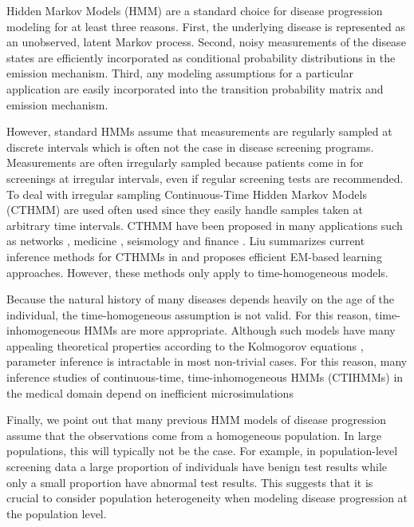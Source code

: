 \documentclass{article}
\begin{document}
Hidden Markov Models (HMM) are a standard choice for disease progression modeling for at least three reasons. 
First,  the underlying disease is represented as an unobserved, latent Markov process.  
Second,  noisy measurements of the disease states are efficiently incorporated as conditional probability distributions  in the emission mechanism. 
Third, any modeling assumptions for a particular application are easily incorporated into the transition probability matrix and emission mechanism. 

However, standard HMMs assume that measurements are regularly sampled at discrete intervals which is often not the case in disease screening programs. Measurements are often irregularly sampled because patients come in for screenings at irregular intervals, even if regular screening tests are recommended.
To deal with irregular sampling Continuous-Time Hidden Markov Models (CTHMM) are used often used since they easily handle samples taken at arbitrary time intervals. CTHMM have been proposed in many applications such as networks \cite{Wei_2002}, medicine \cite{Bureau_2003}, seismology \cite{Lu_2017} and finance \cite{Krishnamurthy_2016}.  Liu summarizes current inference methods for CTHMMs in \cite{Liu_2015} and proposes efficient EM-based learning approaches. However, these methods only apply to time-homogeneous models.

Because the natural history of many diseases depends heavily on the age of the individual, the time-homogeneous assumption is not valid.  For this reason, time-inhomogeneous HMMs are more appropriate.  Although such models have many appealing theoretical properties according to the Kolmogorov equations \cite{Zeifman_1994}, parameter inference is intractable in most non-trivial cases. For this reason, many inference studies of continuous-time, time-inhomogeneous HMMs (CTIHMMs) in the medical domain depend on inefficient microsimulations \cite{Sonnernberg_1993,Myers_2000,Canfell_2004}


Finally, we point out that many previous HMM models of disease progression assume that the observations come from a homogeneous population. In large populations, this will typically not be the case. For example, in population-level screening data a large proportion of individuals have benign test results while only a small proportion have abnormal test results. This suggests that it is crucial to consider population heterogeneity when modeling disease progression at the population level.
\end{document}
